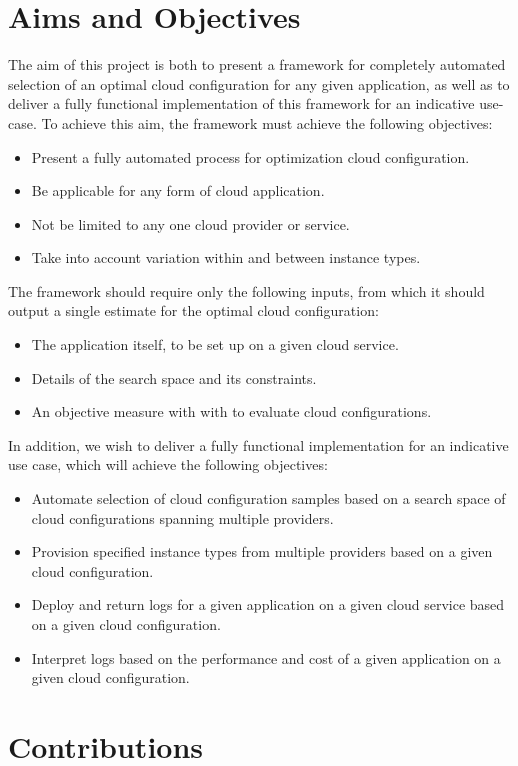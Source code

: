\documentclass{report}
\begin{document}
\section{Aims and Objectives}
The aim of this project is both to present a framework for completely automated selection of an optimal cloud configuration for any given application, as well as to deliver a fully functional implementation of this framework for an indicative use-case. To achieve this aim, the framework must achieve the following objectives:
\begin{itemize}
\item Present a fully automated process for optimization cloud configuration.
\item Be applicable for any form of cloud application.
\item Not be limited to any one cloud provider or service.
\item Take into account variation within and between instance types.
\end{itemize}
The framework should require only the following inputs, from which it should output a single estimate for the optimal cloud configuration:
\begin{itemize}
\item The application itself, to be set up on a given cloud service.
\item Details of the search space and its constraints.
\item An objective measure with with to evaluate cloud configurations.
\end{itemize}
In addition, we wish to deliver a fully functional implementation for an indicative use case, which will achieve the following objectives:
\begin{itemize}
\item Automate selection of cloud configuration samples based on a search space of cloud configurations spanning multiple providers.
\item Provision specified instance types from multiple providers based on a given cloud configuration.
\item Deploy and return logs for a given application on a given cloud service based on a given cloud configuration.
\item Interpret logs based on the performance and cost of a given application on a given cloud configuration.
\end{itemize}
\section{Contributions}
\end{document}
